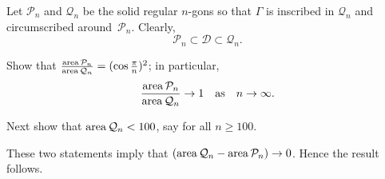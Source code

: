 Let $\mathcal{P}_n$ and $\mathcal{Q}_n$ be the solid regular $n$-gons
so that $\Gamma$ is inscribed in $\mathcal{Q}_n$ and circumscribed around~$\mathcal{P}_n$.
Clearly,
\[\mathcal{P}_n\subset\mathcal{D}\subset\mathcal{Q}_n.\]

Show that 
$\tfrac{\mathop{\rm area}\nolimits\mathcal{P}_n}{\mathop{\rm area}\nolimits\mathcal{Q}_n}=(\cos\tfrac\pi n)^2$;
in particular, 
$$\frac{\mathop{\rm area}\nolimits\mathcal{P}_n}{\mathop{\rm area}\nolimits\mathcal{Q}_n}\to 1
\quad
\text{as}
\quad
n\to\infty.$$

Next show that $\mathop{\rm area}\nolimits\mathcal{Q}_n<100$, say for all $n\ge 100$.

These two statements imply that
$(\mathop{\rm area}\nolimits\mathcal{Q}_n-\mathop{\rm area}\nolimits\mathcal{P}_n)\to 0$.
Hence the result follows.


